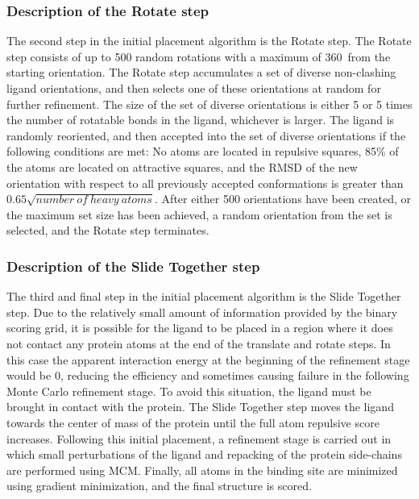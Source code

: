 \subsubsection{Description of the Rotate step}
The second step in the initial placement algorithm is the Rotate step.
The Rotate step consists of up to 500 random rotations with a maximum of 360\textdegree\ from the starting orientation.
The Rotate step accumulates a set of diverse non-clashing ligand orientations, and then selects one of these orientations at random for further refinement.
The size of the set of diverse orientations is either 5 or 5 times the number of rotatable bonds in the ligand, whichever is larger.
The ligand is randomly reoriented, and then accepted into the set of diverse orientations if the following conditions are met: No atoms are located in repulsive squares, 85\% of the atoms are located on attractive squares, and the \ac{RMSD} of the new orientation with respect to all previously accepted conformations is greater than $0.65\sqrt{number\ of\ heavy\ atoms}$.
After either 500 orientations have been created, or the maximum set size has been achieved, a random orientation from the set is selected, and the Rotate step terminates.

\subsubsection{Description of the Slide Together step}
The third and final step in the initial placement algorithm is the Slide Together step.
Due to the relatively small amount of information provided by the binary scoring grid, it is possible for the ligand to be placed in a region where it does not contact any protein atoms at the end of the translate and rotate steps.
In this case the apparent interaction energy at the beginning of the refinement stage would be 0, reducing the efficiency and sometimes causing failure in the following Monte Carlo refinement stage.
To avoid this situation, the ligand must be brought in contact with the protein.
The Slide Together step moves the ligand towards the center of mass of the protein until the full atom repulsive score increases. 
Following this initial placement, a refinement stage is carried out in which small perturbations of the ligand and repacking of the protein side-chains are performed using \ac{MCM}.
Finally, all atoms in the binding site are minimized using gradient minimization, and the final structure is scored.

